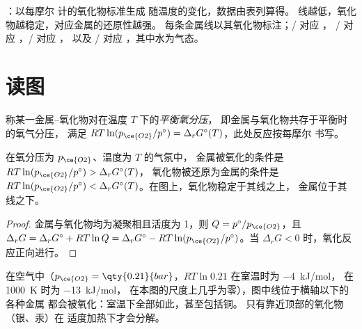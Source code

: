 \begin{omfigure}
{\small {}：以每摩尔  计的氧化物标准生成
随温度的变化，数据由表列算得。
线越低，氧化物越稳定，对应金属的还原性越强。
每条金属线以其氧化物标注；/ 对应 ，
/ 对应 ，/ 对应 ，
以及 / 对应 ，其中水为气态。}
\end{omfigure}

\section{读图}

\begin{definition}[平衡氧分压]\label{def:b2:ellingham:oxygen-pressure}
称某一金属–氧化物对在温度 $T$ 下的\emph{平衡氧分压}，
即金属与氧化物共存于平衡时的氧气分压，
满足 $RT\ln(p_{\ce{O2}}/p^\circ) = \Delta_r
G^\circ(T)$，此处反应按每摩尔  书写。
\end{definition}

\begin{theorem}[金属与氧化物的区域]\label{thm:b2:ellingham:domains}
在氧分压为 $p_{\ce{O2}}$、温度为 $T$ 的气氛中，
金属被氧化的条件是 $RT\ln(p_{\ce{O2}}/p^\circ) > \Delta_r G^\circ(T)$，
氧化物被还原为金属的条件是 $RT\ln(p_{\ce{O2}}/p^\circ) < \Delta_r
G^\circ(T)$。在图上，氧化物稳定于其线之上，
金属位于其线之下。
\end{theorem}

\begin{proof}
金属与氧化物均为凝聚相且活度为 1，则 $Q = p^\circ/p_{\ce{O2}}$，且
$\Delta_r G = \Delta_r G^\circ + RT\ln Q = \Delta_r G^\circ - RT\ln(p_{\ce{O2}}/
p^\circ)$。当 $\Delta_r G < 0$ 时，氧化反应正向进行。
\end{proof}

在空气中（$p_{\ce{O2}} = \qty{0.21}{bar}$，$RT\ln 0.21$ 在室温时为 \qty{-4}{kJ/mol}，
在 \qty{1000}{K} 时为 \qty{-13}{kJ/mol}，
在本图的尺度上几乎为零），图中线位于横轴以下的各种金属
都会被氧化：室温下全部如此，甚至包括铜。
只有靠近顶部的氧化物（银、汞）在
适度加热下才会分解。

